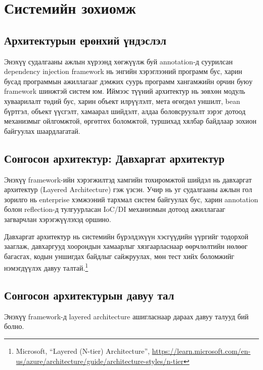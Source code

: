 \chapter{Системийн зохиомж}

\section{Архитектурын ерөнхий үндэслэл}

Энэхүү судалгааны ажлын хүрээнд хөгжүүлж буй annotation-д суурилсан dependency injection framework нь энгийн хэрэглээний программ бус, харин бусад программын ажиллагааг дэмжих суурь программ хангамжийн орчин буюу framework шинжтэй систем юм. Иймээс түүний архитектур нь зөвхөн модуль хуваарилалт төдий бус, харин объект илрүүлэлт, мета өгөгдөл уншилт, bean бүртгэл, объект үүсгэлт, хамаарал шийдэлт, алдаа боловсруулалт зэрэг дотоод механизмыг ойлгомжтой, өргөтгөх боломжтой, туршихад хялбар байдлаар зохион байгуулах шаардлагатай.

\section{Сонгосон архитектур: Давхаргат архитектур}

Энэхүү framework-ийн хэрэгжилтэд хамгийн тохиромжтой шийдэл нь давхаргат архитектур (Layered Architecture) гэж үзсэн. Учир нь уг судалгааны ажлын гол зорилго нь enterprise хэмжээний тархмал систем байгуулах бус, харин annotation болон reflection-д тулгуурласан IoC/DI механизмын дотоод ажиллагааг загварчлан хэрэгжүүлэхэд оршино.

Давхаргат архитектур нь системийн бүрэлдэхүүн хэсгүүдийн үүргийг тодорхой зааглаж, давхаргууд хоорондын хамаарлыг хязгаарласнаар өөрчлөлтийн нөлөөг багасгах, кодын уншигдах байдлыг сайжруулах, мөн тест хийх боломжийг нэмэгдүүлэх давуу талтай.\footnote{Microsoft, ``Layered (N-tier) Architecture'', \url{https://learn.microsoft.com/en-us/azure/architecture/guide/architecture-styles/n-tier}} 

\clearpage
\section{Сонгосон архитектурын давуу тал}

Энэхүү framework-д layered architecture ашигласнаар
дараах давуу талууд бий болно.

